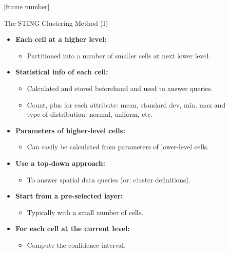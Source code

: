 \documentclass[aspectratio=169,t,xcolor=dvipsnames]{beamer}
\begin{document}
  {
    [frame number]
    \begin{frame}{The STING Clustering Method (I)}
      \begin{itemize}
        \item \textbf{Each cell at a higher level:}
        \begin{itemize}
          \item Partitioned into a number of smaller cells at next lower level.
        \end{itemize}
        \item \textbf{Statistical info of each cell:}
        \begin{itemize}
          \item Calculated and stored beforehand and used to answer queries.
          \item Count, plus for each attribute: mean, standard dev, min, max and \\
          type of distribution: normal, uniform, etc.
        \end{itemize}
        \item \textbf{Parameters of higher-level cells:}
        \begin{itemize}
          \item Can easily be calculated from parameters of lower-level cells.
        \end{itemize}
        \item \textbf{Use a top-down approach:}
        \begin{itemize}
          \item To answer spatial data queries (or: cluster definitions).
        \end{itemize}
        \item \textbf{Start from a pre-selected layer:}
        \begin{itemize}
          \item Typically with a small number of cells.
        \end{itemize}
        \item \textbf{For each cell at the current level:}
        \begin{itemize}
          \item Compute the confidence interval.
        \end{itemize}
      \end{itemize}
    \end{frame}
  }
\end{document}
